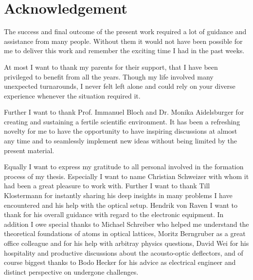 \chapter*{Acknowledgement}

The success and final outcome of the present work required a lot of guidance
and assistance from many people. Without them it would not have been possible
for me to deliver this work and remember the exciting time I had in the past
weeks.

At most I want to thank my parents for their support, that I have been
privileged to benefit from all the years. Though my life involved many
unexpected turnarounds, I never felt left alone and could rely on your
diverse experience whenever the situation required it.

Further I want to thank Prof. Immanuel Bloch and Dr. Monika Aidelsburger for
creating and sustaining a fertile scientific environment. It has been a
refreshing novelty for me to have the opportunity to have inspiring
discussions at almost any time and to seamlessly implement new ideas without
being limited by the present material.

Equally I want to express my gratitude to all personal involved in the
formation process of my thesis. Especially I want to name Christian Schweizer
with whom it had been a great pleasure to work with. Further I want to thank
Till Klostermann for instantly sharing his deep insights in many problems I
have encountered and his help with the optical setup. Hendrik von Raven I want
to thank for his overall guidance with regard to the electronic equipment.
In addition I owe special thanks to Michael Schreiber who helped me understand
the theoretical foundations of atoms in optical lattices, Moritz Berngruber
as a great office colleague and for his help with arbitray physics questions,
David Wei for his hospitality and productive discussions about the
acousto-optic deflectors, and of course biggest thanks to Bodo Hecker for his
advice as electrical engineer and distinct perspective on undergone challenges.

